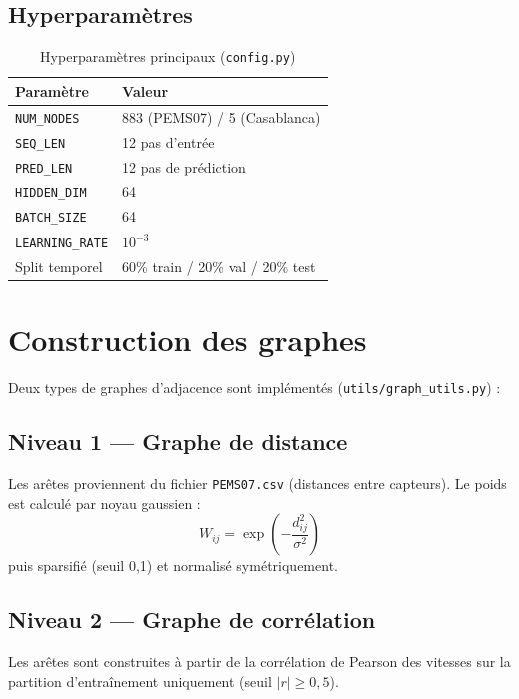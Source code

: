 \documentclass[12pt,a4paper]{report}
\begin{document}
\subsection{Hyperparamètres}

\begin{table}[H]
  \centering
  \caption{Hyperparamètres principaux (\texttt{config.py})}
  \label{tab:hyperparams}
  \begin{tabular}{ll}
    \toprule
    Paramètre            & Valeur \\
    \midrule
    \texttt{NUM\_NODES}  & 883 (PEMS07) / 5 (Casablanca) \\
    \texttt{SEQ\_LEN}    & 12 pas d'entrée \\
    \texttt{PRED\_LEN}   & 12 pas de prédiction \\
    \texttt{HIDDEN\_DIM} & 64 \\
    \texttt{BATCH\_SIZE} & 64 \\
    \texttt{LEARNING\_RATE} & $10^{-3}$ \\
    Split temporel       & 60\% train / 20\% val / 20\% test \\
    \bottomrule
  \end{tabular}
\end{table}

\section{Construction des graphes}

Deux types de graphes d'adjacence sont implémentés (\texttt{utils/graph\_utils.py}) :

\subsection{Niveau 1 — Graphe de distance}

Les arêtes proviennent du fichier \texttt{PEMS07.csv} (distances entre capteurs).
Le poids est calculé par noyau gaussien :
\begin{equation}
  W_{ij} = \exp\left(-\frac{d_{ij}^2}{\sigma^2}\right)
\end{equation}
puis sparsifié (seuil 0{,}1) et normalisé symétriquement.

\subsection{Niveau 2 — Graphe de corrélation}

Les arêtes sont construites à partir de la corrélation de Pearson des vitesses
sur la partition d'entraînement uniquement (seuil $|r| \geq 0{,}5$).
\end{document}
